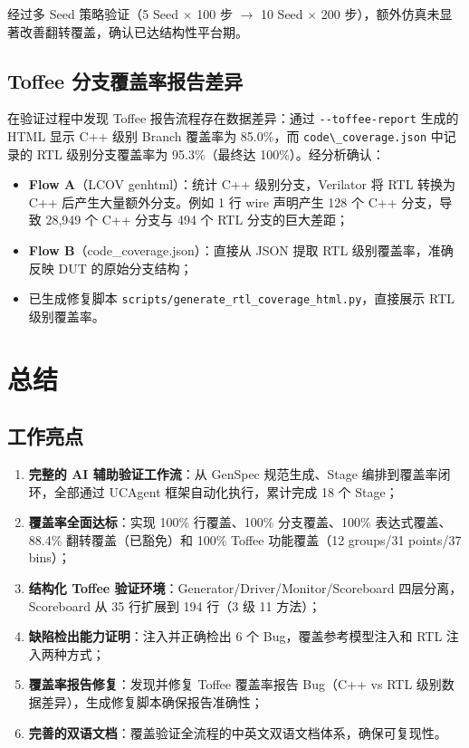 \documentclass[12pt,a4paper]{ctexart}
\begin{document}
经过多 Seed 策略验证（5 Seed $\times$ 100 步 $\rightarrow$ 10 Seed $\times$ 200 步），额外仿真未显著改善翻转覆盖，确认已达结构性平台期。

\subsection{Toffee 分支覆盖率报告差异}

在验证过程中发现 Toffee 报告流程存在数据差异：通过 \lstinline{--toffee-report} 生成的 HTML 显示 C++ 级别 Branch 覆盖率为 85.0\%，而 \lstinline{code\_coverage.json} 中记录的 RTL 级别分支覆盖率为 95.3\%（最终达 100\%）。经分析确认：
\begin{itemize}[leftmargin=*]
  \item \textbf{Flow A}（LCOV genhtml）：统计 C++ 级别分支，Verilator 将 RTL 转换为 C++ 后产生大量额外分支。例如 1 行 wire 声明产生 128 个 C++ 分支，导致 28,949 个 C++ 分支与 494 个 RTL 分支的巨大差距；
  \item \textbf{Flow B}（code\_coverage.json）：直接从 JSON 提取 RTL 级别覆盖率，准确反映 DUT 的原始分支结构；
  \item 已生成修复脚本 \lstinline{scripts/generate_rtl_coverage_html.py}，直接展示 RTL 级别覆盖率。
\end{itemize}

\newpage

\section{总结}

\subsection{工作亮点}

\begin{enumerate}[leftmargin=*]
  \item \textbf{完整的 AI 辅助验证工作流}：从 GenSpec 规范生成、Stage 编排到覆盖率闭环，全部通过 UCAgent 框架自动化执行，累计完成 18 个 Stage；
  \item \textbf{覆盖率全面达标}：实现 100\% 行覆盖、100\% 分支覆盖、100\% 表达式覆盖、88.4\% 翻转覆盖（已豁免）和 100\% Toffee 功能覆盖（12 groups/31 points/37 bins）；
  \item \textbf{结构化 Toffee 验证环境}：Generator/Driver/Monitor/Scoreboard 四层分离，Scoreboard 从 35 行扩展到 194 行（3 级 11 方法）；
  \item \textbf{缺陷检出能力证明}：注入并正确检出 6 个 Bug，覆盖参考模型注入和 RTL 注入两种方式；
  \item \textbf{覆盖率报告修复}：发现并修复 Toffee 覆盖率报告 Bug（C++ vs RTL 级别数据差异），生成修复脚本确保报告准确性；
  \item \textbf{完善的双语文档}：覆盖验证全流程的中英文双语文档体系，确保可复现性。
\end{enumerate}
\end{document}
